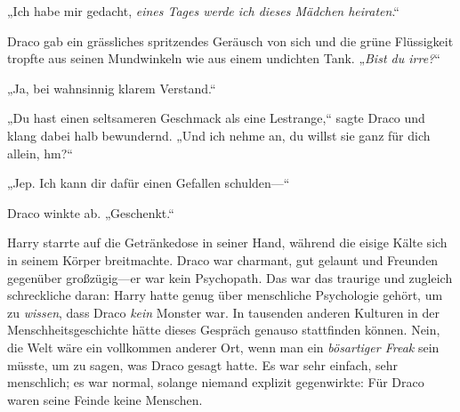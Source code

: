 „Ich habe mir gedacht, \emph{eines Tages werde ich dieses Mädchen heiraten}.“

Draco gab ein grässliches spritzendes Geräusch von sich und die grüne Flüssigkeit tropfte aus seinen Mundwinkeln wie aus einem undichten Tank. „\emph{Bist du irre?}“

„Ja, bei wahnsinnig klarem Verstand.“

„Du hast einen seltsameren Geschmack als eine Lestrange,“ sagte Draco und klang dabei halb bewundernd. „Und ich nehme an, du willst sie ganz für dich allein, hm?“

„Jep. Ich kann dir dafür einen Gefallen schulden—“

Draco winkte ab. „Geschenkt.“

Harry starrte auf die Getränkedose in seiner Hand, während die eisige Kälte sich in seinem Körper breitmachte. Draco war charmant, gut gelaunt und Freunden gegenüber großzügig—er war kein Psychopath. Das war das traurige und zugleich schreckliche daran: Harry hatte genug über menschliche Psychologie gehört, um zu \emph{wissen}, dass Draco \emph{kein} Monster war. In tausenden anderen Kulturen in der Menschheitsgeschichte hätte dieses Gespräch genauso stattfinden können. Nein, die Welt wäre ein vollkommen anderer Ort, wenn man ein \emph{bösartiger Freak} sein müsste, um zu sagen, was Draco gesagt hatte. Es war sehr einfach, sehr menschlich; es war normal, solange niemand explizit gegenwirkte: Für Draco waren seine Feinde keine Menschen.

